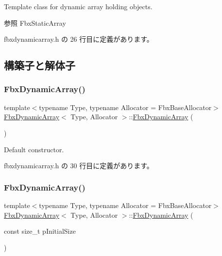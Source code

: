 Template class for dynamic array holding objects.

\begin{DoxySeeAlso}{参照}
Fbx\+Static\+Array 
\end{DoxySeeAlso}


 fbxdynamicarray.\+h の 26 行目に定義があります。



\subsection{構築子と解体子}
\mbox{\label{class_fbx_dynamic_array_a279819589a3ae9252213f2efeddec299}} 
\subsubsection{\texorpdfstring{Fbx\+Dynamic\+Array()}{FbxDynamicArray()}\hspace{0.1cm}{\footnotesize\ttfamily [1/3]}}
{\footnotesize\ttfamily template$<$typename Type, typename Allocator = Fbx\+Base\+Allocator$>$ \\
\hyperlink{class_fbx_dynamic_array}{Fbx\+Dynamic\+Array}$<$ Type, Allocator $>$\+::\hyperlink{class_fbx_dynamic_array}{Fbx\+Dynamic\+Array} (\begin{DoxyParamCaption}{ }\end{DoxyParamCaption})\hspace{0.3cm}{\ttfamily [inline]}}



Default constructor. 



 fbxdynamicarray.\+h の 30 行目に定義があります。

\mbox{\label{class_fbx_dynamic_array_a51406444b76ab195c4d87ab456385281}} 
\subsubsection{\texorpdfstring{Fbx\+Dynamic\+Array()}{FbxDynamicArray()}\hspace{0.1cm}{\footnotesize\ttfamily [2/3]}}
{\footnotesize\ttfamily template$<$typename Type, typename Allocator = Fbx\+Base\+Allocator$>$ \\
\hyperlink{class_fbx_dynamic_array}{Fbx\+Dynamic\+Array}$<$ Type, Allocator $>$\+::\hyperlink{class_fbx_dynamic_array}{Fbx\+Dynamic\+Array} (\begin{DoxyParamCaption}\item[{const size\+\_\+t}]{p\+Initial\+Size }\end{DoxyParamCaption})\hspace{0.3cm}{\ttfamily [inline]}}

